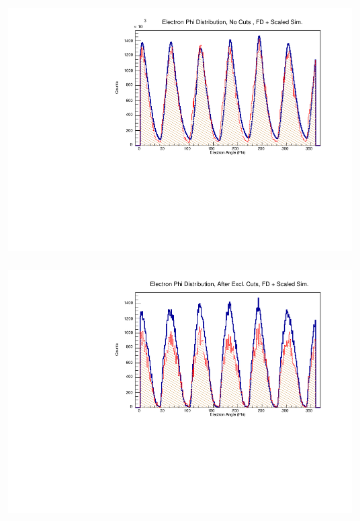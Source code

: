         \begin{figure}
            \centering
            \begin{subfigure}{.45\textwidth}
                \centering
                \includegraphics[width=1\textwidth]{figures/Simulation/kinematics_basic/hist_electron_phi_nocut_fd_Double.pdf}
            \end{subfigure}%
            \begin{subfigure}{.45\textwidth}
                \centering
                \includegraphics[width=1\textwidth]{figures/Simulation/kinematics_basic/hist_electron_phi_excut_fd_Double.pdf}
            \end{subfigure}
            \begin{subfigure}{.45\textwidth}
                \centering

\end{subfigure}
\end{figure}
